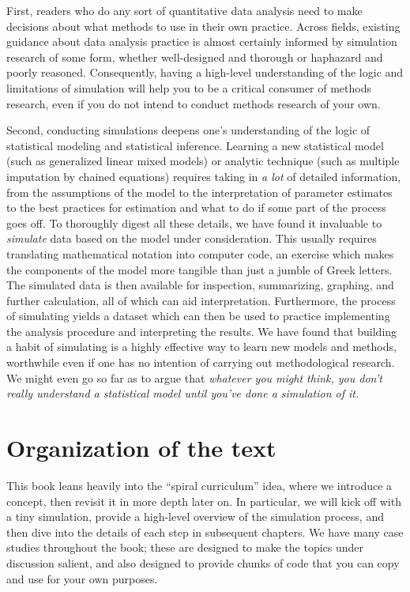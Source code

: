\documentclass[
]{book}
\begin{document}
First, readers who do any sort of quantitative data analysis need to make decisions about what methods to use in their own practice.
Across fields, existing guidance about data analysis practice is almost certainly informed by simulation research of some form, whether well-designed and thorough or haphazard and poorly reasoned.
Consequently, having a high-level understanding of the logic and limitations of simulation will help you to be a critical consumer of methods research, even if you do not intend to conduct methods research of your own.

Second, conducting simulations deepens one's understanding of the logic of statistical modeling and statistical inference.
Learning a new statistical model (such as generalized linear mixed models) or analytic technique (such as multiple imputation by chained equations) requires taking in \emph{a lot} of detailed information, from the assumptions of the model to the interpretation of parameter estimates to the best practices for estimation and what to do if some part of the process goes off.
To thoroughly digest all these details, we have found it invaluable to \emph{simulate} data based on the model under consideration.
This usually requires translating mathematical notation into computer code, an exercise which makes the components of the model more tangible than just a jumble of Greek letters.
The simulated data is then available for inspection, summarizing, graphing, and further calculation, all of which can aid interpretation.
Furthermore, the process of simulating yields a dataset which can then be used to practice implementing the analysis procedure and interpreting the results.
We have found that building a habit of simulating is a highly effective way to learn new models and methods, worthwhile even if one has no intention of carrying out methodological research.
We might even go so far as to argue that \emph{whatever you might think, you don't really understand a statistical model until you've done a simulation of it.}

\section{Organization of the text}\label{organization-of-the-text}

This book leans heavily into the ``spiral curriculum'' idea, where we introduce a concept, then revisit it in more depth later on.
In particular, we will kick off with a tiny simulation, provide a high-level overview of the simulation process, and then dive into the details of each step in subsequent chapters.
We have many case studies throughout the book; these are designed to make the topics under discussion salient, and also designed to provide chunks of code that you can copy and use for your own purposes.
\end{document}
